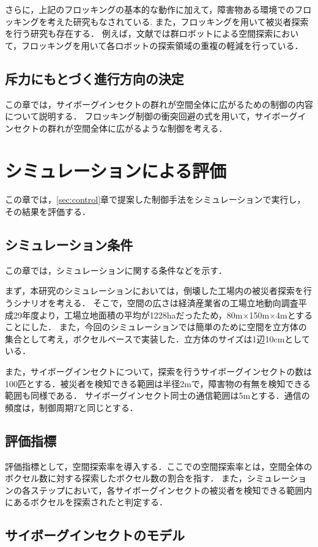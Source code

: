 \documentclass[a4paper,11pt]{jarticle}
\begin{document}
	さらに，上記のフロッキングの基本的な動作に加えて，障害物ある環境でのフロッキングを考えた研究もなされている\cite{obstacle}.
	また，フロッキングを用いて被災者探索を行う研究も存在する．
	例えば，文献\cite{exploration}では群ロボットによる空間探索において，フロッキングを用いて各ロボットの探索領域の重複の軽減を行っている．
	\subsection{斥力にもとづく進行方向の決定}
	この章では，サイボーグインセクトの群れが空間全体に広がるための制御の内容について説明する．
	フロッキング制御の衝突回避の式を用いて，サイボーグインセクトの群れが空間全体に広がるような制御を考える．
	\section{シミュレーションによる評価}
	この章では，\ref{sec:control}章で提案した制御手法をシミュレーションで実行し，その結果を評価する．
	\subsection{シミュレーション条件}
	この章では，シミュレーションに関する条件などを示す．
	
	まず，本研究のシミュレーションにおいては，倒壊した工場内の被災者探索を行うシナリオを考える．
	そこで，空間の広さは経済産業省の工場立地動向調査平成29年度より，工場立地面積の平均が1228haだったため，80m$\times$150m$\times$4mとすることにした．
	また，今回のシミュレーションでは簡単のために空間を立方体の集合として考え，ボクセルベースで実装した．立方体のサイズは1辺10cmとしている．%
	
	また，サイボーグインセクトについて，探索を行うサイボーグインセクトの数は100匹とする．被災者を検知できる範囲は半径2mで，障害物の有無を検知できる範囲も同様である．
	サイボーグインセクト同士の通信範囲は5mとする．通信の頻度は，制御周期$T$と同じとする．
	\subsection{評価指標}
	評価指標として，空間探索率を導入する．ここでの空間探索率とは，空間全体のボクセル数に対する探索したボクセル数の割合を指す．
	また，シミュレーションの各ステップにおいて，各サイボーグインセクトの被災者を検知できる範囲内にあるボクセルを探索されたと判定する．
	\subsection{サイボーグインセクトのモデル}
	\label{sec:algorithm}
\end{document}
